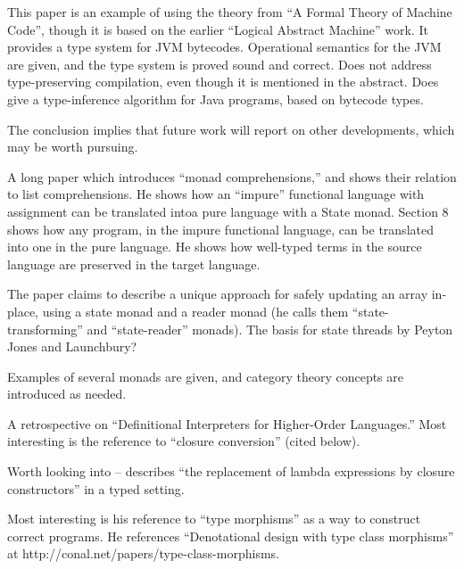 \documentclass[11pt]{article}
\begin{document}

This paper is an example of using the theory from ``A Formal Theory of
Machine Code'', though it is based on the earlier ``Logical Abstract
Machine'' work. It provides a type system for JVM
bytecodes. Operational semantics for the JVM are given, and the type
system is proved sound and correct. Does not address type-preserving
compilation, even though it is mentioned in the abstract. Does give a
type-inference algorithm for Java programs, based on bytecode types.

The conclusion implies that future work will report on other
developments, which may be worth pursuing.


A long paper which introduces ``monad comprehensions,'' and shows
their relation to list comprehensions. He shows how an ``impure''
functional language with assignment can be translated intoa pure
language with a State monad. Section 8 shows how any program, in the
impure functional language, can be translated into one in the pure
language. He shows how well-typed terms in the source language are
preserved in the target language.

The paper claims to describe a unique approach for safely updating an
array in-place, using a state monad and a reader monad (he calls them
``state-transforming'' and ``state-reader'' monads). The basis for
state threads by Peyton Jones and Launchbury?

Examples of several monads are given, and category theory concepts are
introduced as needed.


A retrospective on ``Definitional Interpreters for Higher-Order
Languages.'' Most interesting is the reference to ``closure
conversion'' (cited below).


Worth looking into -- describes ``the replacement of lambda
expressions by closure constructors'' in a typed setting.


Most interesting is his reference to ``type morphisms'' as a way to
construct correct programs. He references ``Denotational design with
type class morphisms'' at
http://conal.net/papers/type-class-morphisms.

\end{document}
